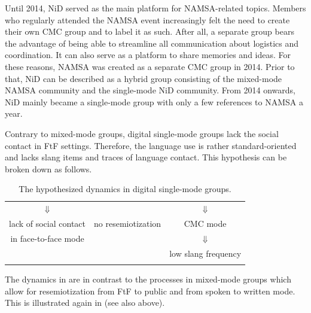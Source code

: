 \documentclass[output=paper]{langsci/langscibook}
\begin{document}
Until 2014, NiD served as the main platform for NAMSA-related topics. Members who regularly attended the NAMSA event increasingly felt the need to create their own CMC group and to label it as such. After all, a separate group bears the advantage of being able to streamline all communication about logistics and coordination. It can also serve as a platform to share memories and ideas. For these reasons, NAMSA was created as a separate CMC group in 2014.  Prior to that, NiD can be described as a hybrid group consisting of the mixed-mode NAMSA community and the single-mode NiD community. From 2014 onwards, NiD mainly became a single-mode group with only a few references to NAMSA a year.

Contrary to mixed-mode groups, digital single-mode groups lack the social contact in FtF settings. Therefore, the language use is rather standard-oriented and lacks slang items and traces of language contact. This hypothesis can be broken down as follows.

 
\begin{table} 
\begin{tabularx}{0.8\textwidth}{ccc}
\lsptoprule
\multicolumn{3}{c}{digital single-mode groups}\\
\hline
${\Downarrow}$ & & ${\Downarrow}$\\
lack of social contact & no resemiotization & CMC mode\\
in face-to-face mode & & ${\Downarrow}$\\
& & low slang frequency\\
\lspbottomrule
\end{tabularx}
\caption{The hypothesized dynamics in digital single-mode groups.}
\label{tab:radke:3}
\end{table}  


The dynamics in  are in contrast to the processes in mixed-mode groups which allow for resemiotization from FtF to public and from spoken to written mode. This is illustrated again in  (see also  above).
\end{document}
